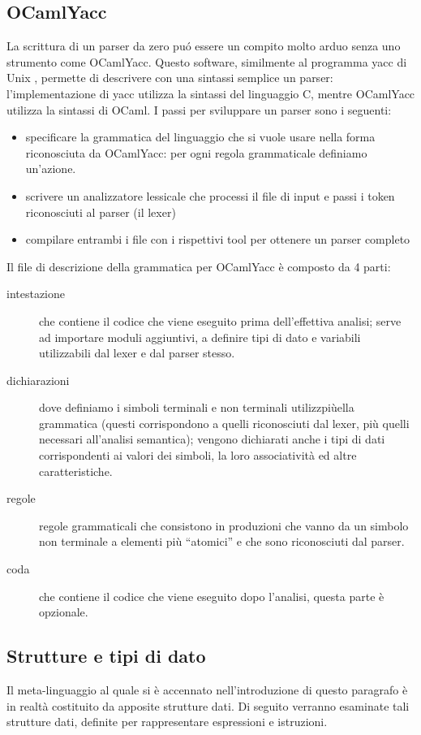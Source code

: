 \documentclass[a4paper,10pt]{article}
\begin{document}
\subsection{OCamlYacc}
La scrittura di un parser da zero pu\'o essere un compito molto arduo senza uno
strumento come OCamlYacc. Questo software, similmente al programma yacc di Unix
, permette di descrivere con una sintassi semplice un parser: l'implementazione
 di yacc utilizza la sintassi del linguaggio C, mentre OCamlYacc utilizza la
 sintassi di OCaml.
I passi per sviluppare un parser sono i seguenti:
\begin{itemize}
    \item specificare la grammatica del linguaggio che si vuole usare nella
forma riconosciuta da OCamlYacc: per ogni regola grammaticale definiamo 
un'azione.
    \item scrivere un analizzatore lessicale che processi il file di input e
passi i token riconosciuti al parser (il lexer)
    \item compilare entrambi i file con i rispettivi tool per ottenere un
parser completo
\end{itemize}
Il file di descrizione della grammatica per OCamlYacc \`e composto da 4 parti:
\begin{description}
\item[intestazione] che contiene il codice che viene eseguito prima 
dell'effettiva analisi; serve ad importare moduli aggiuntivi, a definire tipi
di dato e variabili utilizzabili dal lexer e dal parser stesso.

\item[dichiarazioni] dove definiamo i simboli terminali e non terminali
utilizzpi\`uella grammatica (questi corrispondono a quelli riconosciuti dal
lexer, pi\`u quelli necessari all'analisi semantica); vengono dichiarati 
anche i tipi di dati corrispondenti ai valori dei simboli, 
la loro associativit\`a ed altre caratteristiche.

\item[regole] regole grammaticali che consistono in produzioni che vanno da un
simbolo non terminale a elementi pi\`u ``atomici'' e che sono riconosciuti dal
parser.

\item[coda] che contiene il codice che viene eseguito dopo l'analisi, questa
parte \`e opzionale.
\end{description}

\subsection{Strutture e tipi di dato}
Il meta-linguaggio al quale si \`e accennato nell'introduzione di questo 
paragrafo \`e in realt\`a costituito da apposite strutture dati. 
Di seguito verranno esaminate tali strutture dati, definite per 
rappresentare espressioni e istruzioni.
\end{document}
